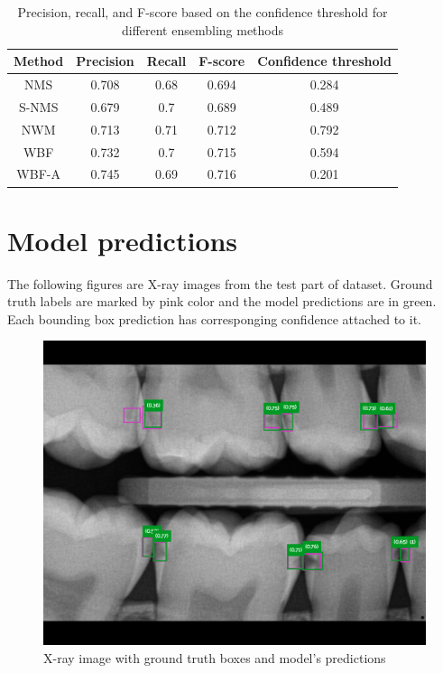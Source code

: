 \begin{table}[h]
    \begin{tabular}{|c|c|c|c|c|}
        \hline
        Method & Precision & Recall & F-score & Confidence threshold \\ \hline
        NMS    & 0.708     & 0.68   & 0.694   & 0.284                \\ \hline
        S-NMS  & 0.679     & 0.7    & 0.689   & 0.489                \\ \hline
        NWM    & 0.713     & 0.71   & 0.712   & 0.792                \\ \hline
        WBF    & 0.732     & 0.7    & 0.715   & 0.594                \\ \hline
        WBF-A  & 0.745     & 0.69   & 0.716   & 0.201                \\ \hline
    \end{tabular}
    \caption{Precision, recall, and F-score based on the confidence threshold for different ensembling methods}
    \label{tab:ensembling_prf:grid_search}
\end{table}

\chapter{Model predictions}
\label{appendix:model_predictions}
The following figures are X-ray images from the test part of dataset. Ground truth labels are marked by pink color and the model predictions are in green. Each bounding box prediction has corresponging confidence attached to it.
\begin{figure}
    \includegraphics[width=0.9\linewidth]{images/no_rest1.png}
    \caption{X-ray image with ground truth boxes and model's predictions}
    \label{fig:pred_img1}
\end{figure}

